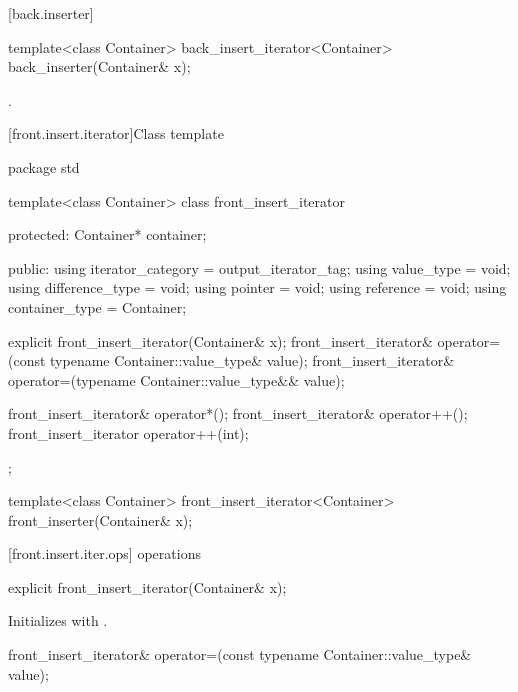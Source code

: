 [back.inserter]{ }

%
\begin{itemdecl}
template<class Container>
  back_insert_iterator<Container> back_inserter(Container& x);
\end{itemdecl}

\begin{itemdescr}
\pnum
\returns
{}.
\end{itemdescr}

[front.insert.iterator]{Class template }

%
\begin{codeblock}
package std {
  template<class Container>
  class front_insert_iterator {
  protected:
    Container* container;

  public:
    using iterator_category = output_iterator_tag;
    using value_type        = void;
    using difference_type   = void;
    using pointer           = void;
    using reference         = void;
    using container_type    = Container;

    explicit front_insert_iterator(Container& x);
    front_insert_iterator& operator=(const typename Container::value_type& value);
    front_insert_iterator& operator=(typename Container::value_type&& value);

    front_insert_iterator& operator*();
    front_insert_iterator& operator++();
    front_insert_iterator  operator++(int);
  };

  template<class Container>
    front_insert_iterator<Container> front_inserter(Container& x);
}
\end{codeblock}

[front.insert.iter.ops]{ operations}

%
\begin{itemdecl}
explicit front_insert_iterator(Container& x);
\end{itemdecl}

\begin{itemdescr}
\pnum
\effects
Initializes
with .
\end{itemdescr}

%
\begin{itemdecl}
front_insert_iterator& operator=(const typename Container::value_type& value);
\end{itemdecl}


